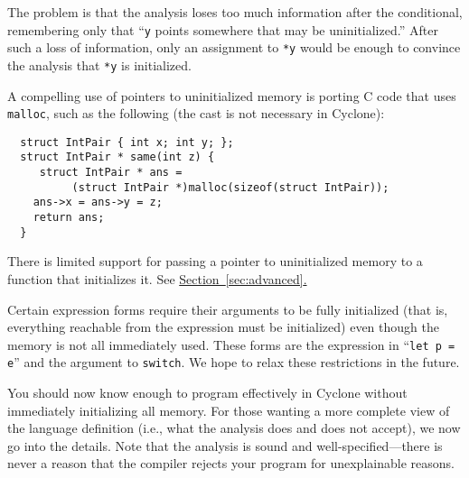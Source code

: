 The problem is that the analysis loses too much information after the
conditional, remembering only that ``\texttt{y} points somewhere that
may be uninitialized.''  After such a loss of information, only an
assignment to \texttt{*y} would be enough to convince the analysis that
\texttt{*y} is initialized.

A compelling use of pointers to uninitialized memory is porting C code
that uses \texttt{malloc}, such as the following (the cast is not
necessary in Cyclone):
\begin{verbatim}
  struct IntPair { int x; int y; };
  struct IntPair * same(int z) {
     struct IntPair * ans = 
          (struct IntPair *)malloc(sizeof(struct IntPair));
    ans->x = ans->y = z;
    return ans;
  }
\end{verbatim}

There is limited support for passing a pointer to uninitialized memory
to a function that initializes it.  See
\hyperref[sec:advanced]{Section~\ref{sec:advanced}.}

Certain expression forms require their arguments to be fully
initialized (that is, everything reachable from the expression must be
initialized) even though the memory is not all immediately used.
These forms are the expression in ``\texttt{let p = e}'' and the
argument to \texttt{switch}.  We hope to relax these restrictions in
the future.

You should now know enough to program effectively in Cyclone without
immediately initializing all memory.  For those wanting a more
complete view of the language definition (i.e., what the analysis does
and does not accept), we now go into the details.  Note that the
analysis is sound and well-specified---there is never a reason that
the compiler rejects your program for unexplainable reasons.

